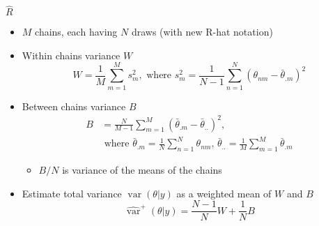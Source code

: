 \documentclass[finnish,english,t]{beamer}
\DeclareMathOperator{\var}{var}
\begin{document}
\begin{frame}{$\widehat{R}$}

  \begin{itemize}
  \item $M$ chains, each having $N$ draws (with new R-hat notation)
  \item<2-> Within chains variance $W$
    \begin{equation*}
      W=\frac{1}{M}\sum_{m=1}^M s^2_m ,\text{ where } 
      s^2_m=\frac{1}{N-1}\sum_{n=1}^N (\theta_{nm}-\bar{\theta}_{.m})^2
    \end{equation*}
  \item<3-> Between chains variance $B$
    \begin{align*}
      B&=\frac{N}{M-1}\sum_{m=1}^M
      (\bar{\theta}_{.m}-\bar{\theta}_{..})^2,\\
      &\text{ where } \bar{\theta}_{.m}=\frac{1}{N}\sum_{n=1}^N \theta_{nm}, \,
      \bar{\theta}_{..}=\frac{1}{M}\sum_{m=1}^M\bar{\theta}_{.m}
    \end{align*}
    \begin{itemize}
      \item<4-> $B/N$ is variance of the means of the chains
    \end{itemize}
    \vspace{2mm}
  \item<5-> Estimate total variance
    $\var(\theta|y)$ as a weighted mean of $W$ and $B$
    \begin{equation*}
      \widehat{\var}^{+}(\theta|y) = \frac{N-1}{N}W+\frac{1}{N}B
    \end{equation*}
  \end{itemize}  

\end{frame}


\end{document}
